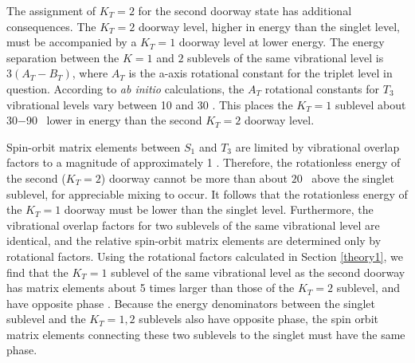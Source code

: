 \documentclass[12pt]{mitthesis}
\begin{document}
The assignment of $K_T=2$ for the second doorway state has additional
consequences.  The $K_T=2$ doorway level, higher in energy than the
singlet level, must be accompanied by a $K_T=1$ doorway level at lower
energy.  %
The energy separation
between the $K=1$ and $2$ sublevels of the same vibrational level is
$3(A_T-B_T)$, where $A_T$ is the a-axis rotational constant for the
triplet level in question.  According to \emph{ab initio}
calculations, the $A_T$ rotational constants for $T_3$ vibrational
levels vary between 10 and 30 \rcm \cite{thom07}.  This places the
$K_T=1$ sublevel about 30$-$90 \rcm\ lower in energy than the second
$K_T=2$ doorway level.




Spin-orbit matrix elements between $S_1$ and $T_3$ are limited by
vibrational overlap factors to a magnitude of approximately 1 \rcm.
Therefore, the rotationless energy of the second ($K_T=2$) doorway
cannot be more than about $20$ \rcm\ above the singlet sublevel, for
appreciable mixing to occur.  It follows that the rotationless energy
of the $K_T=1$ doorway must be lower than the singlet level.
Furthermore, the vibrational overlap factors for two sublevels of the
same vibrational level are identical, and the relative spin-orbit
matrix elements are determined only by rotational factors.  Using the
rotational factors calculated in Section \ref{theory1}, we find that
the $K_T=1$ sublevel of the same vibrational level as the second
doorway has matrix elements about 5 times larger than those of the
$K_T=2$ sublevel, and have opposite phase \cite{stevens73}.  Because
the energy denominators between the singlet sublevel and the $K_T=1,2$
sublevels also have opposite phase, the spin orbit matrix elements
connecting these two sublevels to the singlet must have the same
phase.
\end{document}

